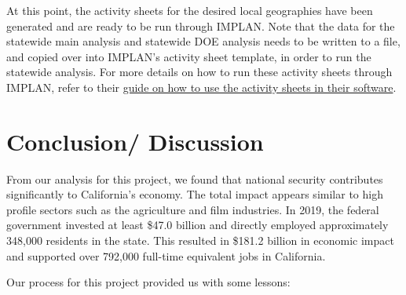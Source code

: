 \documentclass[
]{book}
\begin{document}
At this point, the activity sheets for the desired local geographies have been generated and are ready to be run through IMPLAN. Note that the data for the statewide main analysis and statewide DOE analysis needs to be written to a file, and copied over into IMPLAN's activity sheet template, in order to run the statewide analysis. For more details on how to run these activity sheets through IMPLAN, refer to their \href{https://support.implan.com/hc/en-us/articles/360040713754-Using-the-Event-Template}{guide on how to use the activity sheets in their software}.

\hypertarget{conclusion}{%
\chapter{Conclusion/ Discussion}\label{conclusion}}

From our analysis for this project, we found that national security contributes significantly to California's economy. The total impact appears similar to high profile sectors such as the agriculture and film industries. In 2019, the federal government invested at least \$47.0 billion and directly employed approximately 348,000 residents in the state. This resulted in \$181.2 billion in economic impact and supported over 792,000 full-time equivalent jobs in California.

Our process for this project provided us with some lessons:
\end{document}
